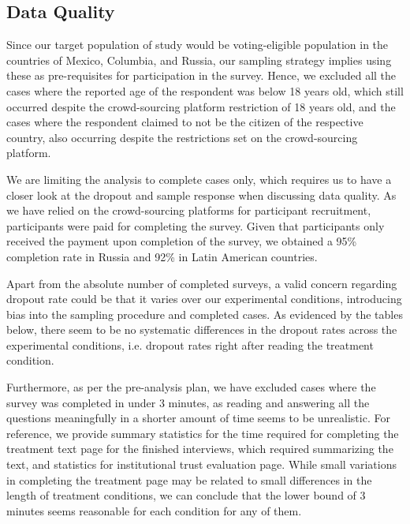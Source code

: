 \documentclass[11pt, ngerman,english,a4]{article}
\begin{document}




\clearpage
\subsection{Data Quality}

\onehalfspacing

Since our target population of study would be voting-eligible population in the countries of Mexico, Columbia, and Russia, our sampling strategy implies using these as pre-requisites for participation in the survey. Hence, we excluded all the cases where the reported age of the respondent was below 18 years old, which still occurred despite the crowd-sourcing platform restriction of 18 years old, and the cases where the respondent claimed to not be the citizen of the respective country, also occurring despite the restrictions set on the crowd-sourcing platform. 

We are limiting the analysis to complete cases only, which requires us to have a closer look at the dropout and sample response when discussing data quality. As we have relied on the crowd-sourcing platforms for participant recruitment, participants were paid for completing the survey. Given that participants only received the payment upon completion of the survey, we obtained a 95\% completion rate in Russia and 92\% in Latin American countries.

Apart from the absolute number of completed surveys, a valid concern regarding dropout rate could be that it varies over our experimental conditions, introducing bias into the sampling procedure and completed cases. As evidenced by the tables below, there seem to be no systematic differences in the dropout rates across the experimental conditions, i.e. dropout rates right after reading the treatment condition. 




\clearpage

Furthermore, as per the pre-analysis plan, we have excluded cases where the survey was completed in under 3 minutes, as reading and answering all the questions meaningfully in a shorter amount of time seems to be unrealistic.
For reference, we provide summary statistics for the time required for completing the treatment text page for the finished interviews, which required summarizing the text, and statistics for institutional trust evaluation page. While small variations in completing the treatment page may be related to small differences in the length of treatment conditions, we can conclude that the lower bound of 3 minutes seems reasonable for each condition for any of them. 
\end{document}
